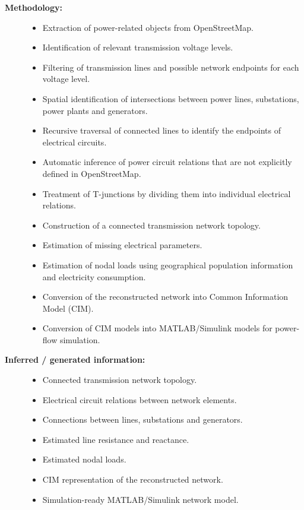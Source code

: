 \begin{description}
    \item[\textbf{Methodology:}] \hfill
    \begin{itemize}
        \item Extraction of power-related objects from OpenStreetMap.
        \item Identification of relevant transmission voltage levels.
        \item Filtering of transmission lines and possible network endpoints
        for each voltage level.
        \item Spatial identification of intersections between power lines,
        substations, power plants and generators.
        \item Recursive traversal of connected lines to identify the endpoints
        of electrical circuits.
        \item Automatic inference of power circuit relations that are not
        explicitly defined in OpenStreetMap.
        \item Treatment of T-junctions by dividing them into individual
        electrical relations.
        \item Construction of a connected transmission network topology.
        \item Estimation of missing electrical parameters.
        \item Estimation of nodal loads using geographical population
        information and electricity consumption.
        \item Conversion of the reconstructed network into Common Information
        Model (CIM).
        \item Conversion of CIM models into MATLAB/Simulink models for
        power-flow simulation.
    \end{itemize}

    \item[\textbf{Inferred / generated information:}] \hfill
    \begin{itemize}
        \item Connected transmission network topology.
        \item Electrical circuit relations between network elements.
        \item Connections between lines, substations and generators.
        \item Estimated line resistance and reactance.
        \item Estimated nodal loads.
        \item CIM representation of the reconstructed network.
        \item Simulation-ready MATLAB/Simulink network model.
    \end{itemize}


\end{description}
